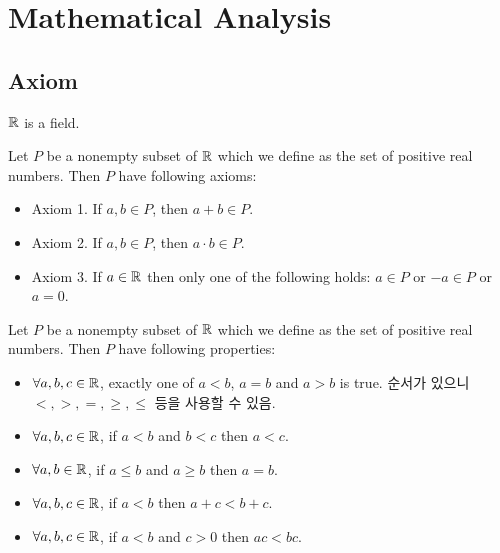 \chapter{Mathematical Analysis}


\section{Axiom}

\begin{definition}

  \label{def:field}
\end{definition}

\begin{axiom}
  $\mathbb{R}$ is a field.
  \label{axm:field}
\end{axiom}

\begin{axiom}
  Let $P$ be a nonempty subset of $\mathbb{R}$ which we define as the set of positive
  real numbers. Then $P$ have following axioms:
  \begin{itemize}
    \item Axiom 1. If $a, b \in P$, then $a + b \in P$.
    \item Axiom 2. If $a, b \in P$, then $a \cdot b \in P$.
    \item Axiom 3. If $a \in \mathbb{R}$ then only one of the following holds: $a \in P$
          or $-a \in P$ or $a = 0$.
  \end{itemize}
  \label{axm:order}
\end{axiom}

\begin{property}
  Let $P$ be a nonempty subset of $\mathbb{R}$ which we define as the set of positive
  real numbers. Then $P$ have following properties:
  \begin{itemize}
    \item $\forall a, b, c \in \mathbb{R}$, exactly one of $a < b$, $a = b$ and $a > b$
          is true. 순서가 있으니 $<, >, =, \ge, \le$ 등을 사용할 수 있음.
    \item $\forall a, b, c \in \mathbb{R}$, if $a < b$ and $b < c$ then $a < c$.
    \item $\forall a, b \in \mathbb{R}$, if $a \le b$ and $a \ge b$ then $a = b$.
    \item $\forall a, b, c \in \mathbb{R}$, if $a < b$ then $a + c < b + c$.
    \item $\forall a, b, c \in \mathbb{R}$, if $a < b$ and $c > 0$ then $ac < bc$.
  \end{itemize}
\end{property}

